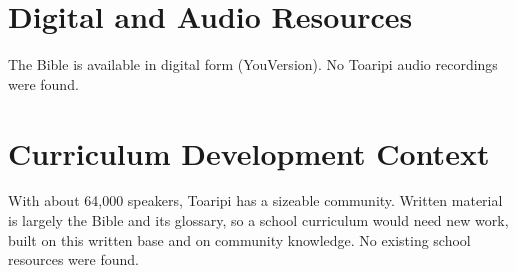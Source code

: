 \documentclass[12pt]{article}
\begin{document}
\section{Digital and Audio Resources}
The Bible is available in digital form (YouVersion). No Toaripi audio recordings were found.

\section{Curriculum Development Context}
With about 64,000 speakers, Toaripi has a sizeable community. Written material is largely the Bible and its glossary, so a school curriculum would need new work, built on this written base and on community knowledge. No existing school resources were found.
\end{document}
